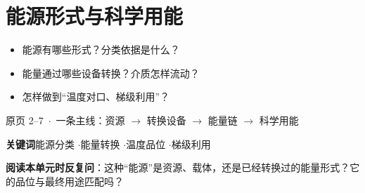 \section{能源形式与科学用能}

\begin{frame}[t,shrink]{}
{\begin{itemize}
  \item 能源有哪些形式？分类依据是什么？
  \item 能量通过哪些设备转换？介质怎样流动？
  \item 怎样做到“温度对口、梯级利用”？
\end{itemize}}
{原页 2--7 \,$\cdot$\, 一条主线：资源 $\rightarrow$ 转换设备 $\rightarrow$ 能量链 $\rightarrow$ 科学用能}
\vspace{3mm}
\begin{center}
\small
\textbf{关键词}\quad 能源分类 \enspace$\cdot$\enspace 能量转换 \enspace$\cdot$\enspace 温度品位 \enspace$\cdot$\enspace 梯级利用
\end{center}
\vspace{1mm}
\begin{plainbox}
\small \textbf{阅读本单元时反复问}：这种“能源”是资源、载体，还是已经转换过的能量形式？它的品位与最终用途匹配吗？
\end{plainbox}
\end{frame}

